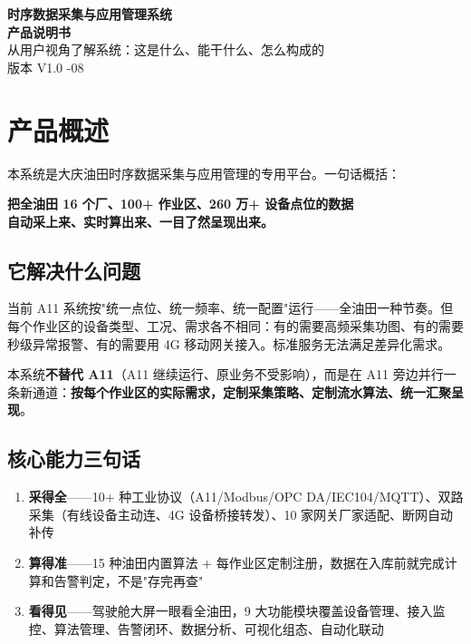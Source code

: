 \documentclass[11pt,a4paper]{ctexart}
\begin{document}
\begin{center}
{\Huge\bfseries 时序数据采集与应用管理系统\\ 产品说明书}\\
{\large 从用户视角了解系统：这是什么、能干什么、怎么构成的}\\
{\large 版本 V1.0 -08}
\end{center}

\vspace{1em}\noindent\hrulefill\vspace{1em}

\section{产品概述}

本系统是大庆油田时序数据采集与应用管理的专用平台。一句话概括：

\begin{center}
\large\bfseries 把全油田 16 个厂、100+ 作业区、260 万+ 设备点位的数据\\自动采上来、实时算出来、一目了然呈现出来。
\end{center}

\subsection{它解决什么问题}

当前 A11 系统按"统一点位、统一频率、统一配置"运行——全油田一种节奏。但每个作业区的设备类型、工况、需求各不相同：有的需要高频采集功图、有的需要秒级异常报警、有的需要用 4G 移动网关接入。标准服务无法满足差异化需求。

本系统\textbf{不替代 A11}（A11 继续运行、原业务不受影响），而是在 A11 旁边并行一条新通道：\textbf{按每个作业区的实际需求，定制采集策略、定制流水算法、统一汇聚呈现}。

\subsection{核心能力三句话}

\begin{enumerate}[leftmargin=*]
  \item \textbf{采得全}——10+ 种工业协议（A11/Modbus/OPC DA/IEC104/MQTT）、双路采集（有线设备主动连、4G 设备桥接转发）、10 家网关厂家适配、断网自动补传
  \item \textbf{算得准}——15 种油田内置算法 + 每作业区定制注册，数据在入库前就完成计算和告警判定，不是"存完再查"
  \item \textbf{看得见}——驾驶舱大屏一眼看全油田，9 大功能模块覆盖设备管理、接入监控、算法管理、告警闭环、数据分析、可视化组态、自动化联动
\end{enumerate}
\end{document}
